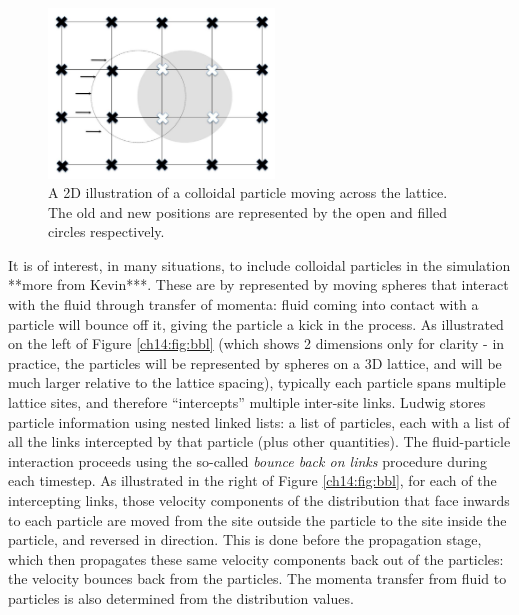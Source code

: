 \begin{figure}[t]
\centering
\includegraphics[width=6cm]{Chapters/chapter14/figures/particlemove}
\caption{A 2D illustration of a colloidal particle moving across the
    lattice. The old and new positions are represented by the open and
    filled circles respectively.}
\label{ch14:fig:particlemove}
\end{figure}

It is of interest, in many situations, to include colloidal particles
in the simulation **more from Kevin***. These are by represented by
moving spheres that interact with the fluid through transfer of
momenta: fluid coming into contact with a particle will bounce off it,
giving the particle a kick in the process. As illustrated on the left
of Figure \ref{ch14:fig:bbl} (which shows 2 dimensions only for
clarity - in practice, the particles will be represented by spheres on
a 3D lattice, and will be much larger relative to the lattice
spacing), typically each particle spans multiple lattice sites, and
therefore ``intercepts'' multiple inter-site links. Ludwig stores
particle information using nested linked lists: a list of particles,
each with a list of all the links intercepted by that particle (plus
other quantities). The fluid-particle interaction proceeds using the
so-called {\it bounce back on links} procedure during each timestep. As
illustrated in the right of Figure \ref{ch14:fig:bbl}, for each of the
intercepting links, those velocity components of the distribution that
face inwards to each particle are moved from the site
outside the particle to the site inside the particle, and
reversed in direction. This is done before the propagation stage,
which then propagates these same velocity components back out of the
particles: the velocity bounces back from the particles. The
momenta transfer from fluid to particles is also determined
from the distribution values.

